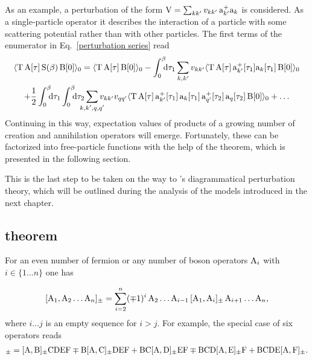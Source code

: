 As an example, a perturbation of the form $\mathrm V = \sum_{k k'} v_{k k'} \, \mathrm
a_{k'}^+ \mathrm a_k$ is considered. As a single-particle operator it describes the
interaction of a particle with some scattering potential rather than with other
particles. The first terms of the enumerator in Eq.~\ref{perturbation series}
read
%
\begin{gather*}
    \av{\op T \, \op A[\tau] \, \op S(\beta) \, \op B[0]}_0 =
    \av{\op T \, \op A[\tau] \, \op B[0]}_0 -
    \int \from 0 \till \beta \D \tau_1
    \sum_{k, k'} v_{k k'}
    \av{
        \op T \, \op A[\tau] \,
        \op a_{k'}^+[\tau_1] \op a_k[\tau_1] \,
        \op B[0]
    }_0 \\ + \frac 1 2
    \int \from 0 \till \beta \D \tau_1
    \int \from 0 \till \beta \D \tau_2
    \sum_{\mathclap{k, k', q, q'}} v_{k k'} v_{q q'}
    \av{
        \op T \, \op A[\tau] \,
        \op a_{k'}^+[\tau_1] \, \op a_k[\tau_1] \,
        \op a_{q'}^+[\tau_2] \, \op a_q[\tau_2] \,
        \op B[0]
    }_0 + \dots
\end{gather*}
%
Continuing in this way, expectation values of products of a growing number of
creation and annihilation operators will emerge. Fortunately, these can be
factorized into free-particle  functions with the help of the
 theorem, which is presented in the following section.

This is the last step to be taken on the way to 's diagrammatical
perturbation theory, which will be outlined during the analysis of the models
introduced in the next chapter.

\subsection{ theorem}

For an even number of fermion or any number of boson operators $\mathrm A_i$ with $i
\in \{ 1 \dots n \}$ one has

\begin{equation} \label{left to right}
    [\mathrm A_1, \mathrm A_2 \dots \mathrm A_n]_\pm =
    \sum_{i = 2}^n (\mp 1)^i \,
    \mathrm A_2 \dots \mathrm A_{i - 1} \,
    [\mathrm A_1, \mathrm A_i]_\pm \,
    \mathrm A_{i + 1} \dots \mathrm A_n,
\end{equation}
%
where $i \dots j$ is an empty sequence for $i > j$. For example, the special
case of six operators reads
%
\begin{align*}
        [\op A, \op B \op C \op D \op E \op F]_\pm
    =   [\op A, \op B]_\pm \op C \op D \op E \op F
    \mp \op B [\op A, \op C]_\pm \op D \op E \op F
    +   \op B \op C [\op A, \op D]_\pm \op E \op F
    \mp \op B \op C \op D [\op A, \op E]_\pm \op F
    +   \op B \op C \op D \op E [\op A, \op F]_\pm.
\end{align*}

